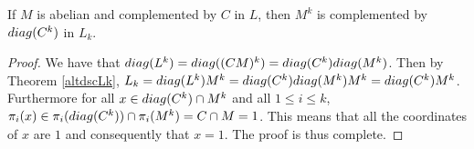 \begin{theorem}
    \label{S2:complMkab}
    If $M$ is abelian and complemented by $C$ in $L$, then $M^k$ is complemented by $diag({C^k})$ in $L_k$.
\end{theorem}

\begin{proof}
    We have that $diag({L^k}) = diag({(CM)^k}) = diag({C^k})diag({M^k})$. 
    Then by Theorem \ref{altdscLk}, $L_k = diag({L^k})M^k = diag({C^k})diag({M^k})M^k = diag({C^k})M^k$. 
    Furthermore for all $x \in diag({C^k}) \cap M^k$ and all $1 \le i \le k$, $\pi_i(x) \in \pi_i(diag({C^k})) \cap \pi_i(M^k) = C \cap M = 1$. 
    This means that all the coordinates of $x$ are $1$ and consequently that $x = 1$. The proof is thus complete.
\end{proof}
